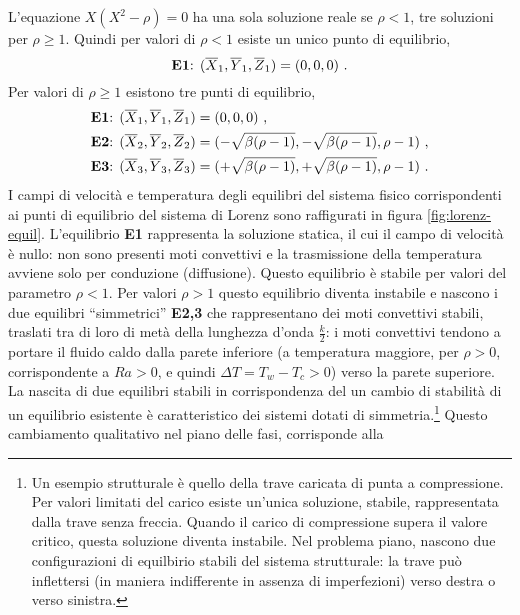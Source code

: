 L'equazione $X(X^2 - \rho) = 0$ ha una sola soluzione reale se $\rho < 1$, tre soluzioni
 per $\rho \geq 1$. Quindi per valori di $\rho < 1$ esiste un unico punto di equilibrio,
\begin{equation}
 \text{\textbf{E1}: } (\overline{X}_1, \overline{Y}_1, \overline{Z}_1) = (0,0,0) \ .
\end{equation}
Per valori di $\rho \geq 1$ esistono tre punti di equilibrio,
\begin{equation}
\begin{aligned}
 \text{\textbf{E1}: } &  (\overline{X}_1, \overline{Y}_1, \overline{Z}_1) = (0,0,0) \ , \\
 \text{\textbf{E2}: } &  (\overline{X}_2, \overline{Y}_2, \overline{Z}_2) =
 (-\sqrt{\beta(\rho-1)},-\sqrt{\beta(\rho-1)},\rho-1) \ , \\
 \text{\textbf{E3}: } &  (\overline{X}_3, \overline{Y}_3, \overline{Z}_3) =
 (+\sqrt{\beta(\rho-1)},+\sqrt{\beta(\rho-1)},\rho-1) \ .
\end{aligned}
\end{equation}
%
I campi di velocità e temperatura degli equilibri del sistema fisico
 corrispondenti ai punti di equilibrio del sistema di Lorenz sono raffigurati in
 figura \ref{fig:lorenz-equil}. L'equilibrio \textbf{E1} rappresenta la soluzione
 statica, il cui il campo di velocità è nullo: non sono presenti moti convettivi
 e la trasmissione della temperatura avviene solo per conduzione (diffusione).
Questo equilibrio è stabile per valori del parametro $\rho<1$. Per valori $\rho > 1$
 questo equilibrio diventa instabile e nascono i due equilibri ``simmetrici''
 \textbf{E2,3} che rappresentano dei moti convettivi stabili, traslati tra di loro
 di metà della lunghezza d'onda $\frac{k}{2}$: i moti convettivi tendono a portare il
 fluido caldo dalla parete inferiore (a temperatura maggiore, per $\rho>0$, corrispondente
 a $Ra > 0$, e quindi $\Delta T = T_w - T_c >0$) verso la parete superiore.
 La nascita di due equilibri stabili
 in corrispondenza del un cambio di stabilità di un equilibrio esistente è
 caratteristico dei sistemi dotati di simmetria.\footnote{
Un esempio strutturale è quello della trave caricata di punta a compressione. Per
 valori limitati del carico esiste un'unica soluzione, stabile, rappresentata dalla
 trave senza freccia. Quando il carico di compressione supera il valore critico,
 questa soluzione diventa instabile. Nel problema piano, nascono due configurazioni
 di equilbirio stabili del sistema strutturale: la trave può inflettersi 
 (in maniera indifferente in assenza di imperfezioni) verso destra o verso sinistra.
} Questo cambiamento qualitativo nel piano delle fasi, corrisponde alla
